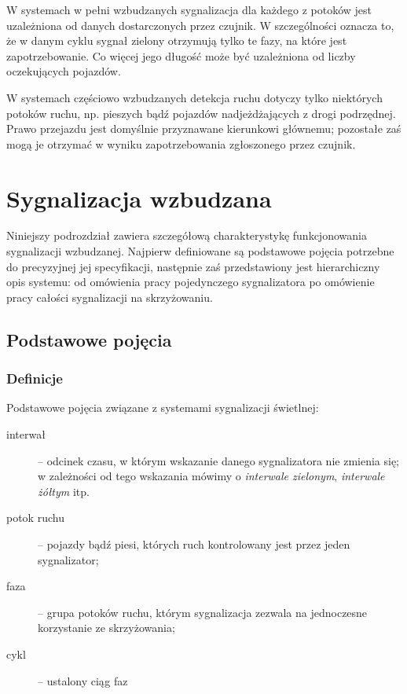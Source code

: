 \documentclass{pracamgr}
\begin{document}
W systemach w pełni wzbudzanych sygnalizacja dla każdego z potoków
jest uzależniona od danych dostarczonych przez czujnik. W
szczególności oznacza to, że w danym cyklu sygnał zielony otrzymują
tylko te fazy, na które jest zapotrzebowanie. Co więcej jego długość może być
uzależniona od liczby oczekujących pojazdów.

W systemach częściowo wzbudzanych detekcja ruchu dotyczy tylko
niektórych potoków ruchu, np. pieszych bądź pojazdów nadjeżdżających z
drogi podrzędnej. Prawo przejazdu jest domyślnie przyznawane
kierunkowi głównemu; pozostałe zaś mogą je otrzymać w wyniku
zapotrzebowania zgłoszonego przez czujnik.

\section{Sygnalizacja wzbudzana}
\label{s:sygn-szczegoly}

Niniejszy podrozdział zawiera szczegółową charakterystykę
funkcjonowania sygnalizacji wzbudzanej. Najpierw definiowane są
podstawowe pojęcia potrzebne do precyzyjnej jej specyfikacji,
następnie zaś przedstawiony jest hierarchiczny opis systemu: od omówienia
pracy pojedynczego sygnalizatora po omówienie pracy całości
sygnalizacji na skrzyżowaniu.

\subsection{Podstawowe pojęcia}
\label{ss:pojecia}

\subsubsection{Definicje}
\label{ss:definicje}
Podstawowe pojęcia związane z systemami sygnalizacji świetlnej:
\begin{description}
  \item[interwał] -- odcinek czasu, w którym wskazanie danego
  sygnalizatora nie zmienia się; w zależności od tego wskazania mówimy
  o \emph{interwale zielonym}, \emph{interwale żółtym} itp.
  \item[potok ruchu] -- pojazdy bądź piesi, których ruch kontrolowany
  jest przez jeden sygnalizator;
  \item[faza] -- grupa potoków ruchu, którym sygnalizacja zezwala na jednoczesne
  korzystanie ze skrzyżowania;
  \item[cykl] -- ustalony ciąg faz
\end{description}
\end{document}
